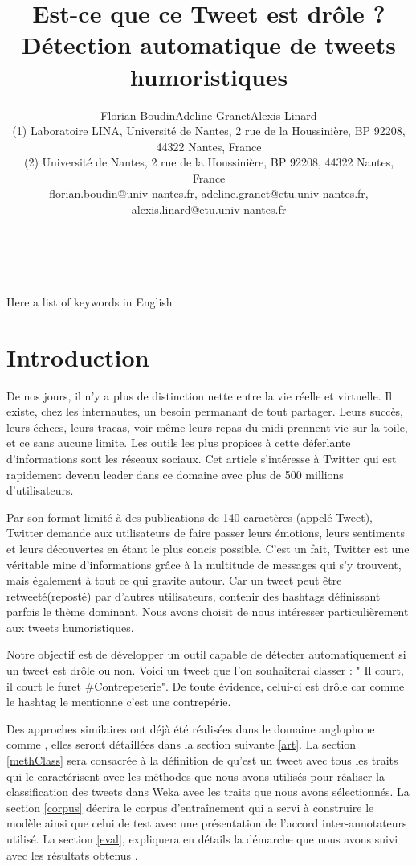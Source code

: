 \documentclass[10pt,a4paper,twoside]{article}
\title{Est-ce que ce Tweet est drôle ? Détection automatique de tweets humoristiques}
\author{Florian Boudin\up{1}\quad Adeline Granet\up{2}\quad Alexis Linard\up{2}\\
  (1) Laboratoire LINA, Université de Nantes, 2 rue de la Houssinière, BP 92208, 44322 Nantes, France \\ 
  (2) Université de Nantes, 2 rue de la Houssinière, BP 92208, 44322 Nantes, France\\ 
  florian.boudin@univ-nantes.fr, adeline.granet@etu.univ-nantes.fr, alexis.linard@etu.univ-nantes.fr \\ 
}
\begin{document}
\maketitle


\\

\\

{Here a list of keywords in English}


\section{Introduction}


De nos jours, il n’y a plus de distinction nette entre la vie réelle et virtuelle. Il existe, chez les internautes, un besoin permanant de tout partager. Leurs succès, leurs échecs, leurs tracas, voir même leurs repas du midi prennent vie sur la toile, et ce sans aucune limite. Les outils les plus propices à cette déferlante d’informations sont les réseaux sociaux. Cet article s'intéresse à Twitter qui est rapidement devenu leader dans ce domaine avec plus de 500 millions d’utilisateurs.

Par son format limité à des publications de 140 caractères (appelé Tweet), Twitter demande aux utilisateurs de faire passer leurs émotions, leurs sentiments et leurs découvertes en étant le plus concis possible. C’est un fait, Twitter est une véritable mine d’informations grâce à la multitude de messages qui s'y trouvent, mais également à tout ce qui gravite autour. Car un tweet peut être retweeté(reposté) par d'autres utilisateurs, contenir des hashtags définissant parfois le thème dominant.  Nous avons choisit de nous intéresser particulièrement aux tweets humoristiques.

Notre objectif est de développer un outil capable de détecter automatiquement si un tweet est drôle ou non. Voici un tweet que l’on souhaiterai classer : " Il court, il court le furet \#Contrepeterie".  De toute évidence, celui-ci est drôle car comme le hashtag le mentionne c’est une contrepérie. 

Des approches similaires ont déjà été réalisées dans le domaine anglophone comme \cite{Raz12, Barbosa2010}, elles seront détaillées dans la section suivante \ref{art}. La section \ref{methClass} sera consacrée à la définition de qu'est un tweet avec tous les traits qui le caractérisent avec les méthodes que nous avons utilisés pour réaliser la classification des tweets dans Weka avec les traits que nous avons sélectionnés. La section \ref{corpus} décrira le corpus d'entraînement qui a servi à construire le modèle ainsi que celui de test avec une présentation de l'accord inter-annotateurs utilisé. La section \ref{eval}, expliquera en détails la démarche que nous avons suivi avec les résultats obtenus .
\end{document}
